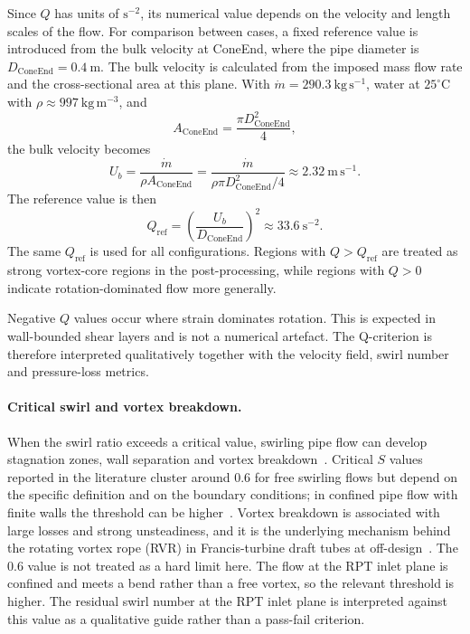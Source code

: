 Since \(Q\) has units of \(\mathrm{s^{-2}}\), its numerical value depends on the velocity and length scales of the flow. For comparison between cases, a fixed reference value is introduced from the bulk velocity at ConeEnd, where the pipe diameter is \(D_{\mathrm{ConeEnd}}=0.4~\mathrm{m}\). The bulk velocity is calculated from the imposed mass flow rate and the cross-sectional area at this plane. With \(\dot{m}=290.3~\mathrm{kg\,s^{-1}}\), water at \(25^\circ\mathrm{C}\) with \(\rho \approx 997~\mathrm{kg\,m^{-3}}\), and
\begin{equation}
A_{\mathrm{ConeEnd}}
=
\frac{\pi D_{\mathrm{ConeEnd}}^2}{4},
\label{eq:Q_coneend_area}
\end{equation}
the bulk velocity becomes
\begin{equation}
U_b =
\frac{\dot{m}}{\rho A_{\mathrm{ConeEnd}}}
=
\frac{\dot{m}}{\rho \pi D_{\mathrm{ConeEnd}}^2/4}
\approx
2.32~\mathrm{m\,s^{-1}}.
\label{eq:Q_bulk_velocity}
\end{equation}
The reference value is then
\begin{equation}
Q_{\mathrm{ref}}
=
\left(\frac{U_b}{D_{\mathrm{ConeEnd}}}\right)^2
\approx
33.6~\mathrm{s^{-2}}.
\label{eq:Q_ref}
\end{equation}
The same \(Q_{\mathrm{ref}}\) is used for all configurations. Regions with \(Q>Q_{\mathrm{ref}}\) are treated as strong vortex-core regions in the post-processing, while regions with \(Q>0\) indicate rotation-dominated flow more generally.

Negative \(Q\) values occur where strain dominates rotation. This is expected in wall-bounded shear layers and is not a numerical artefact. The Q-criterion is therefore interpreted qualitatively together with the velocity field, swirl number and pressure-loss metrics.
 
\paragraph{Critical swirl and vortex breakdown.}
When the swirl ratio exceeds a critical value, swirling pipe flow can develop stagnation zones, wall separation and vortex breakdown~\cite{Rusak2014}. Critical $S$ values reported in the literature cluster around 0.6 for free swirling flows but depend on the specific definition and on the boundary conditions; in confined pipe flow with finite walls the threshold can be higher~\cite{Rusak2014}. Vortex breakdown is associated with large losses and strong unsteadiness, and it is the underlying mechanism behind the rotating vortex rope (RVR) in Francis-turbine draft tubes at off-design~\cite{Brekke2010}. The 0.6 value is not treated as a hard limit here. The flow at the RPT inlet plane is confined and meets a bend rather than a free vortex, so the relevant threshold is higher. The residual swirl number at the RPT inlet plane is interpreted against this value as a qualitative guide rather than a pass-fail criterion.
 

